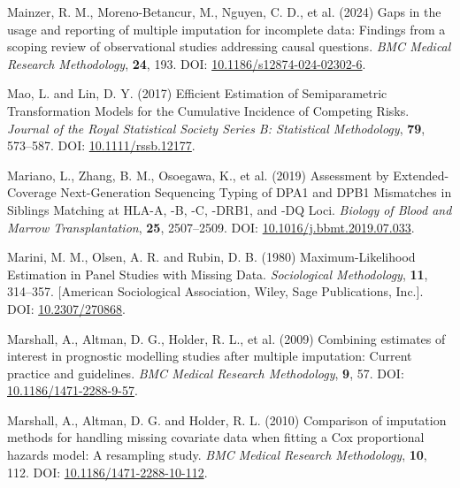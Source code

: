\documentclass[
  letterpaper,
  DIV=11,
  numbers=noendperiod]{scrreprt}
\newlength{\cslhangindent}
\newenvironment{CSLReferences}[2] %
 {\begin{list}{}{%
  \setlength{\itemindent}{0pt}
  \setlength{\leftmargin}{0pt}
  \setlength{\parsep}{0pt}
  \ifodd #1
   \setlength{\leftmargin}{\cslhangindent}
   \setlength{\itemindent}{-1\cslhangindent}
  \fi
  \setlength{\itemsep}{#2\baselineskip}}}
 {\end{list}}
\begin{document}
\begin{CSLReferences}{1}{1}
Mainzer, R. M., Moreno-Betancur, M., Nguyen, C. D., et al. (2024) Gaps
in the usage and reporting of multiple imputation for incomplete data:
Findings from a scoping review of observational studies addressing
causal questions. \emph{BMC Medical Research Methodology}, \textbf{24},
193. DOI:
\href{https://doi.org/10.1186/s12874-024-02302-6}{10.1186/s12874-024-02302-6}.

Mao, L. and Lin, D. Y. (2017) Efficient {Estimation} of {Semiparametric
Transformation Models} for the {Cumulative Incidence} of {Competing
Risks}. \emph{Journal of the Royal Statistical Society Series B:
Statistical Methodology}, \textbf{79}, 573--587. DOI:
\href{https://doi.org/10.1111/rssb.12177}{10.1111/rssb.12177}.

Mariano, L., Zhang, B. M., Osoegawa, K., et al. (2019) Assessment by
{Extended-Coverage Next-Generation Sequencing Typing} of {DPA1} and
{DPB1 Mismatches} in {Siblings Matching} at {HLA-A}, -{B}, -{C},
-{DRB1}, and -{DQ Loci}. \emph{Biology of Blood and Marrow
Transplantation}, \textbf{25}, 2507--2509. DOI:
\href{https://doi.org/10.1016/j.bbmt.2019.07.033}{10.1016/j.bbmt.2019.07.033}.

Marini, M. M., Olsen, A. R. and Rubin, D. B. (1980) Maximum-{Likelihood
Estimation} in {Panel Studies} with {Missing Data}. \emph{Sociological
Methodology}, \textbf{11}, 314--357. {[}American Sociological
Association, Wiley, Sage Publications, Inc.{]}. DOI:
\href{https://doi.org/10.2307/270868}{10.2307/270868}.

Marshall, A., Altman, D. G., Holder, R. L., et al. (2009) Combining
estimates of interest in prognostic modelling studies after multiple
imputation: Current practice and guidelines. \emph{BMC Medical Research
Methodology}, \textbf{9}, 57. DOI:
\href{https://doi.org/10.1186/1471-2288-9-57}{10.1186/1471-2288-9-57}.

Marshall, A., Altman, D. G. and Holder, R. L. (2010) Comparison of
imputation methods for handling missing covariate data when fitting a
{Cox} proportional hazards model: A resampling study. \emph{BMC Medical
Research Methodology}, \textbf{10}, 112. DOI:
\href{https://doi.org/10.1186/1471-2288-10-112}{10.1186/1471-2288-10-112}.


\end{CSLReferences}
\end{document}
